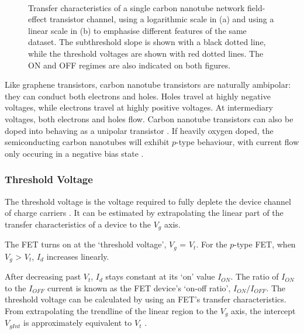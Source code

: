 \documentclass[
  a4paper,
]{scrbook}
\begin{document}
\begin{figure}
\begin{minipage}[t]{0.45\linewidth}
{{}

}

\end{minipage}%
%
\begin{minipage}[t]{0.01\linewidth}

{\centering 

~

}

\end{minipage}%

\caption{\label{fig-literature-characteristics}Transfer characteristics
of a single carbon nanotube network field-effect transistor channel,
using a logarithmic scale in (a) and using a linear scale in (b) to
emphasise different features of the same dataset. The subthreshold slope
is shown with a black dotted line, while the threshold voltages are
shown with red dotted lines. The ON and OFF regimes are also indicated
on both figures.}

\end{figure}

Like graphene transistors, carbon nanotube transistors are naturally
ambipolar: they can conduct both electrons and holes. Holes travel at
highly negative voltages, while electrons travel at highly positive
voltages. At intermediary voltages, both electrons and holes flow.
Carbon nanotube transistors can also be doped into behaving as a
unipolar transistor \autocite{Avouris2007}. If heavily oxygen doped, the
semiconducting carbon nanotubes will exhibit \(p\)-type behaviour, with
current flow only occuring in a negative bias state
\autocite{Shkodra2021}.

\hypertarget{threshold-voltage}{%
\subsubsection*{Threshold Voltage}\label{threshold-voltage}}

The threshold voltage is the voltage required to fully deplete the
device channel of charge carriers \autocite{Martel1998}. It can be
estimated by extrapolating the linear part of the transfer
characteristics of a device to the \(V_g\) axis.

The FET turns on at the `threshold voltage', \(V_g\) = \(V_t\). For the
\(p\)-type FET, when \(V_g\) \textgreater{} \(V_t\), \(I_d\) increases
linearly.

After decreasing past \(V_t\), \(I_d\) stays constant at its `on' value
\(I_{ON}\). The ratio of \(I_{ON}\) to the \(I_{OFF}\) current is known
as the FET device's `on-off ratio', \(I_{ON}/I_{OFF}\). The threshold
voltage can be calculated by using an FET's transfer characteristics.
From extrapolating the trendline of the linear region to the \(V_g\)
axis, the intercept \(V_{gInt}\) is approximately equivalent to \(V_t\)
\autocite{Sze2006}.
\end{document}
